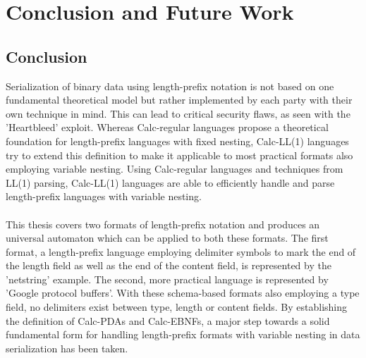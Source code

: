 \section{Conclusion and Future Work}
\label{6.0}
\subsection{Conclusion}
\label{6.1}
Serialization of binary data using length-prefix notation is not based on one fundamental theoretical model but rather implemented by each party with their own technique in mind. This can lead to critical security flaws, as seen with the 'Heartbleed' exploit. Whereas Calc-regular languages propose a theoretical foundation for length-prefix languages with fixed nesting, Calc-LL(1) languages try to extend this definition to make it applicable to most practical formats also employing variable nesting. Using Calc-regular languages and techniques from LL(1) parsing, Calc-LL(1) languages are able to efficiently handle and parse length-prefix languages with variable nesting.\\\\ This thesis covers two formats of length-prefix notation and produces an universal automaton which can be applied to both these formats. The first format, a length-prefix language employing delimiter symbols to mark the end of the length field as well as the end of the content field, is represented by the 'netstring' example. The second, more practical language is represented by 'Google protocol buffers'. With these schema-based formats also employing a type field, no delimiters exist between type, length or content fields. By establishing the definition of Calc-PDAs and Calc-EBNFs, a major step towards a solid fundamental form for handling length-prefix formats with variable nesting in data serialization has been taken.
